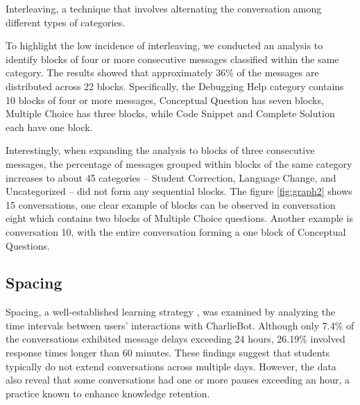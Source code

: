 \documentclass[a4paper,twoside]{article}
\begin{document}
Interleaving, a technique that involves alternating the conversation among
different types of categories.


To highlight the low incidence of interleaving, we conducted an analysis to
identify blocks of four or more consecutive messages classified within the same
category. The results showed that approximately 36\% of the messages are
distributed across 22 blocks. Specifically, the Debugging Help category contains
10 blocks of four or more messages, Conceptual Question has seven blocks,
Multiple Choice has three blocks, while Code Snippet and Complete Solution each
have one block.

Interestingly, when expanding the analysis to blocks of three consecutive
messages, the percentage of messages grouped within blocks of the same category
increases to about 45%
categories – Student Correction, Language Change, and Uncategorized – did not
form any sequential blocks. The figure \ref{fig:graph2} shows 15 conversations,
one clear example of blocks can be observed in conversation eight which contains
two blocks of Multiple Choice questions. Another example is conversation 10,
with the entire conversation forming a one block of Conceptual Questions.


\subsection*{Spacing}

Spacing, a well-established learning strategy \cite{Carvalho20}, was examined
by analyzing the time intervals between users’ interactions with CharlieBot.
Although only 7.4\% of the conversations exhibited message delays exceeding 24
hours, 26.19\% involved response times longer than 60 minutes. These findings
suggest that students typically do not extend conversations across multiple days.
However, the data also reveal that some conversations had one or more pauses
exceeding an hour, a practice known to enhance knowledge retention.

\end{document}
